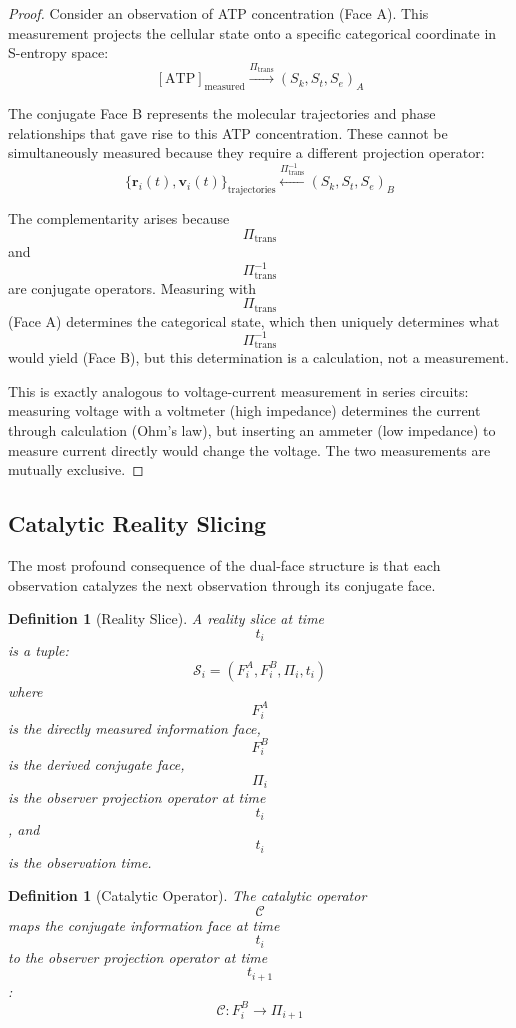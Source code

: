 \documentclass[11pt,twocolumn,a4paper]{article}
\newtheorem{definition}[theorem]{Definition}
\theoremstyle{remark}
\begin{document}
\begin{proof}
Consider an observation of ATP concentration (Face A). This measurement projects the cellular state onto a specific categorical coordinate in S-entropy space:
$$
[\text{ATP}]_{\mathrm{measured}} \xrightarrow{\Pi_{\mathrm{trans}}} (S_k, S_t, S_e)_A
$$

The conjugate Face B represents the molecular trajectories and phase relationships that gave rise to this ATP concentration. These cannot be simultaneously measured because they require a different projection operator:
$$
\{\mathbf{r}_i(t), \mathbf{v}_i(t)\}_{\mathrm{trajectories}} \xleftarrow{\Pi_{\mathrm{trans}}^{-1}} (S_k, S_t, S_e)_B
$$

The complementarity arises because $$\Pi_{\mathrm{trans}}$$ and $$\Pi_{\mathrm{trans}}^{-1}$$ are conjugate operators. Measuring with $$\Pi_{\mathrm{trans}}$$ (Face A) determines the categorical state, which then uniquely determines what $$\Pi_{\mathrm{trans}}^{-1}$$ would yield (Face B), but this determination is a calculation, not a measurement.

This is exactly analogous to voltage-current measurement in series circuits: measuring voltage with a voltmeter (high impedance) determines the current through calculation (Ohm's law), but inserting an ammeter (low impedance) to measure current directly would change the voltage. The two measurements are mutually exclusive.
\end{proof}

\subsection{Catalytic Reality Slicing}

The most profound consequence of the dual-face structure is that each observation catalyzes the next observation through its conjugate face.

\begin{definition}[Reality Slice]
\label{def:reality_slice}
A reality slice at time $$t_i$$ is a tuple:
$$
\mathcal{S}_i = (F_i^A, F_i^B, \Pi_i, t_i)
$$
where $$F_i^A$$ is the directly measured information face, $$F_i^B$$ is the derived conjugate face, $$\Pi_i$$ is the observer projection operator at time $$t_i$$, and $$t_i$$ is the observation time.
\end{definition}

\begin{definition}[Catalytic Operator]
\label{def:catalytic_operator}
The catalytic operator $$\mathcal{C}$$ maps the conjugate information face at time $$t_i$$ to the observer projection operator at time $$t_{i+1}$$:
$$
\mathcal{C}: F_i^B \to \Pi_{i+1}
$$
\end{definition}
\end{document}
